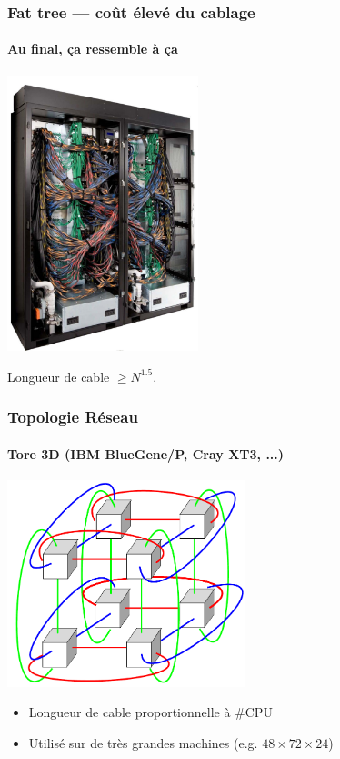 \documentclass[xcolor={x11names,svgnames,psnames}]{beamer}
\begin{document}

\begin{frame}
  \frametitle{Fat tree --- coût élevé du cablage}
  \framesubtitle{Au final, ça ressemble à ça}

  \centering
  \includegraphics[height=8cm]{wiring}

  \bigskip

  Longueur de cable $\geq N^{1.5}$.
\end{frame}



\begin{frame}
  \frametitle{Topologie Réseau}
  \framesubtitle{Tore 3D (IBM BlueGene/P, Cray XT3, ...)}

  \begin{center}
    \includegraphics[height=6cm]{2x2x2torus.pdf}
  \end{center}

  \begin{itemize}
  \item Longueur de cable proportionnelle à \#CPU
  \item Utilisé sur de très grandes machines (e.g. $48 \times 72 \times 24$)
  \end{itemize}
  
\end{frame}
\end{document}
